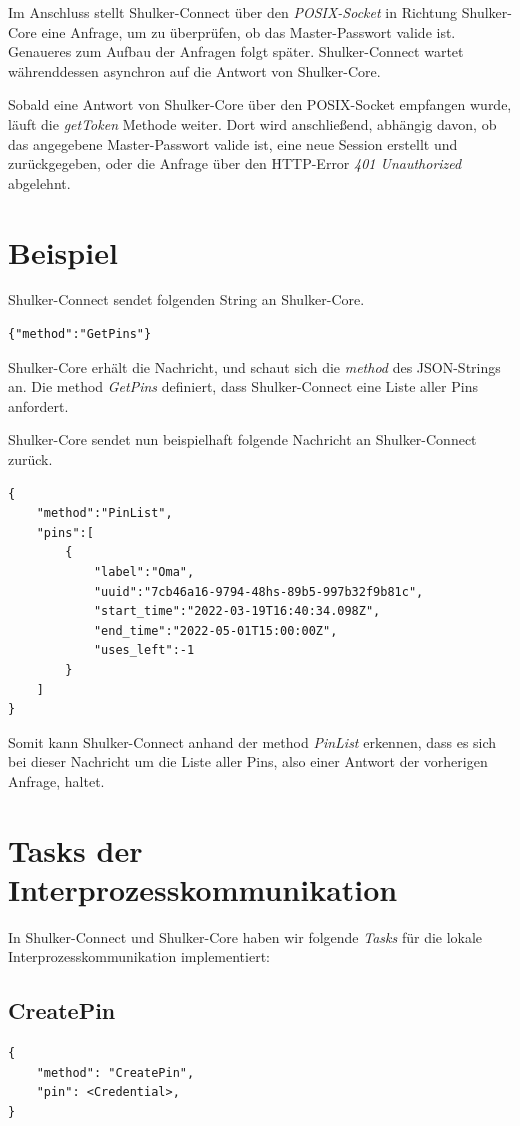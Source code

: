 Im Anschluss stellt Shulker-Connect über den \textit{POSIX-Socket} in Richtung Shulker-Core eine Anfrage, um zu
überprüfen, ob das Master-Passwort valide ist. Genaueres zum Aufbau der Anfragen folgt später.
Shulker-Connect wartet währenddessen asynchron auf die Antwort von Shulker-Core.

Sobald eine Antwort von Shulker-Core über den POSIX-Socket empfangen wurde, läuft die \textit{getToken} 
Methode weiter. Dort wird anschließend, abhängig davon, ob das angegebene Master-Passwort valide ist, eine neue Session 
erstellt und zurückgegeben, oder die Anfrage über den HTTP-Error \textit{401 Unauthorized} abgelehnt.

\section{Beispiel}
Shulker-Connect sendet folgenden String an Shulker-Core.
\begin{lstlisting}
{"method":"GetPins"}
\end{lstlisting}
Shulker-Core erhält die Nachricht, und schaut sich die \textit{method} des JSON-Strings an.
Die method \textit{GetPins} definiert, dass Shulker-Connect eine Liste aller Pins anfordert.

Shulker-Core sendet nun beispielhaft folgende Nachricht an Shulker-Connect zurück.
\begin{lstlisting}
{
    "method":"PinList",
    "pins":[
        {
            "label":"Oma",
            "uuid":"7cb46a16-9794-48hs-89b5-997b32f9b81c",
            "start_time":"2022-03-19T16:40:34.098Z",
            "end_time":"2022-05-01T15:00:00Z",
            "uses_left":-1
        }
    ]
}
\end{lstlisting}
Somit kann Shulker-Connect anhand der method \textit{PinList} erkennen, dass es sich bei dieser Nachricht um die Liste
aller Pins, also einer Antwort der vorherigen Anfrage, haltet.

\pagebreak
\section{Tasks der Interprozesskommunikation}
In Shulker-Connect und Shulker-Core haben wir folgende \textit{Tasks} für die lokale Interprozesskommunikation implementiert:

\subsection{CreatePin}
\begin{lstlisting}
{
    "method": "CreatePin",
    "pin": <Credential>,
}
\end{lstlisting}

